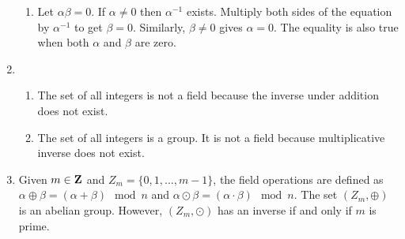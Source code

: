 \begin{enumerate}
\begin{enumerate}
\item Let $\alpha\beta = 0$. If $\alpha \ne 0$ then $\alpha^{-1}$
exists. Multiply both sides of the equation by $\alpha^{-1}$ to get
$\beta = 0$. Similarly, $\beta \ne 0$ gives $\alpha = 0$. The equality
is also true when both $\alpha$ and $\beta$ are zero.
\end{enumerate}

\item
\begin{enumerate}
\item The set of all integers is not a field because the inverse
under addition does not exist.
\item The set of all integers is a group. It is not a field because
multiplicative inverse does not exist.
\end{enumerate}

\item Given $m \in \mathbf{Z}$ and $Z_m = \{0, 1, \ldots, m - 1\}$, the 
field operations are defined as $\alpha \oplus \beta = (\alpha + 
\beta)\mod n$ and $\alpha \odot \beta = (\alpha\cdot\beta)\mod n$.
The set $(Z_m, \oplus)$ is an abelian group. However, $(Z_m, \odot)$
has an inverse if and only if $m$ is prime.
\end{enumerate}
